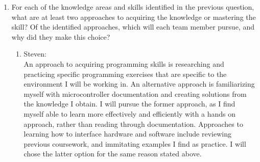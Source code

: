 \documentclass[12pt]{article}
\begin{document}
\begin{enumerate}
\begin{enumerate}
  \end{enumerate}
  \item For each of the knowledge areas and skills identified in the previous
  question, what are at least two approaches to acquiring the knowledge or
  mastering the skill?  Of the identified approaches, which will each team
  member pursue, and why did they make this choice?
  \begin{enumerate}
    \item{Steven:}\\
    An approach to acquiring programming skills is researching and practicing specific
    programming exercises that are specific to the environment I will be working in.
    An alternative approach is familiarizing myself with microcontroller documentation and
    creating solutions from the knowledge I obtain. I will pursue the former approach, as 
    I find myself able to learn more effectively and efficiently with a hands on approach, 
    rather than reading through documentation. Approaches to learning how to interface 
    hardware and software include reviewing previous coursework, and immitating examples
    I find as practice. I will chose the latter option for the same reason stated above.\\
    

\end{enumerate}
\end{enumerate}
\end{document}
